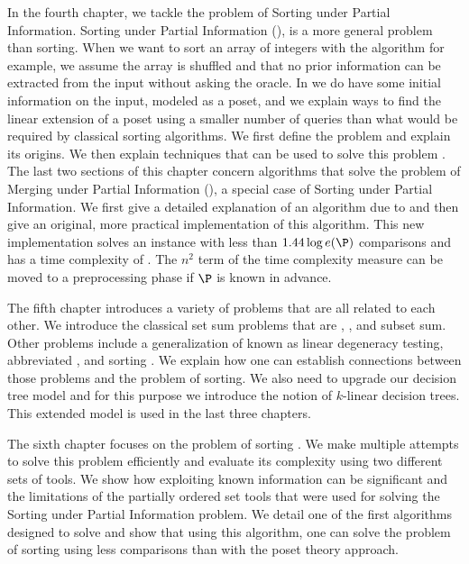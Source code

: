 In the fourth chapter, we tackle the problem of Sorting under Partial
Information. Sorting under Partial Information (\concept{\SUPI}), is
a more general problem than sorting. When we want to sort an array of integers
with the \quicksort algorithm for example, we assume the array is shuffled and
that no prior information can be extracted from the input without asking the
oracle. In \SUPI we do have some initial information on the input, modeled as a
poset, and we explain ways
to find the linear extension of a poset using a smaller number of queries than
what would be required by classical sorting algorithms. We first define
the problem and explain its origins. We then explain techniques that can
be used to solve this problem \cite{kahn:1995,cardinal:2013}. The
last two sections of this chapter concern
algorithms that solve the problem of Merging under Partial Information
(\concept{\MUPI}), a special case of Sorting under Partial Information. We first
give a detailed explanation of an algorithm due to \citet*{linial:1984} and
then give an original, more practical implementation of this algorithm. This
new implementation solves an \MUPI instance with less than \(1.44 \log e(\P)\)
comparisons and has a time complexity of . The
\(n^2\) term of the time complexity measure can be moved to a preprocessing
phase if \(\P\) is known in advance.

The fifth chapter introduces a variety of problems that are all related to
each other. We introduce the classical set sum problems that are
\threeSUM, \kSUM, and subset sum. Other problems include a generalization of
\kSUM known as linear degeneracy testing, abbreviated \kLDT, and sorting \XY.
We explain how one can establish connections between those problems and the problem
of sorting. We also need to upgrade our decision tree model and for this
purpose we introduce the notion of \(k\)-linear decision trees. This
extended model is used in the last three chapters.

The sixth chapter focuses on the problem of sorting \XY. We make
multiple attempts to solve this problem efficiently and evaluate its complexity
using two different sets of tools. We show how exploiting known information
can be significant and the limitations of the partially ordered set tools that
were used for solving the Sorting under Partial Information problem. We
detail one of the first algorithms designed to solve \concept{\SUPI}
\cite{fredman:1976} and
show that using this algorithm, one can solve the problem of sorting \XY
using less comparisons than with the poset theory approach.


